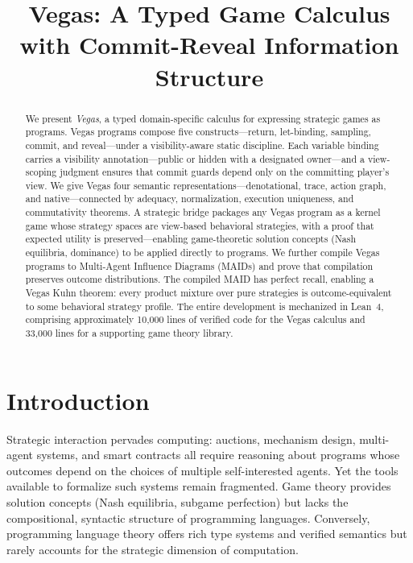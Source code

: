 \documentclass[11pt]{article}
\title{Vegas: A Typed Game Calculus\\with Commit-Reveal Information Structure}
\author{}
\date{}
\begin{document}
\maketitle
 
\begin{abstract}
We present \emph{Vegas}, a typed domain-specific calculus for expressing
strategic games as programs. Vegas programs compose five constructs---return,
let-binding, sampling, commit, and reveal---under a visibility-aware static
discipline. Each variable binding carries a visibility annotation---public or
hidden with a designated owner---and a view-scoping judgment ensures
that commit guards depend only on the committing player's view. We give Vegas four semantic representations---denotational,
trace, action graph, and native---connected by adequacy, normalization,
execution uniqueness, and commutativity theorems. A strategic bridge packages
any Vegas program as a kernel game whose strategy spaces are view-based
behavioral strategies, with a proof that expected utility is
preserved---enabling game-theoretic solution concepts (Nash equilibria,
dominance) to be applied directly to programs. We further compile Vegas programs to
Multi-Agent Influence Diagrams (MAIDs) and prove that compilation preserves
outcome distributions. The compiled MAID has perfect recall, enabling a
Vegas Kuhn theorem: every product mixture over pure strategies is
outcome-equivalent to some behavioral strategy profile. The entire
development is mechanized in Lean~4, comprising approximately 10,000 lines
of verified code for the Vegas calculus and 33,000 lines for a supporting
game theory library.
\end{abstract}

\section{Introduction}\label{sec:intro}

Strategic interaction pervades computing: auctions, mechanism design,
multi-agent systems, and smart contracts all require reasoning about programs
whose outcomes depend on the choices of multiple self-interested agents. Yet
the tools available to formalize such systems remain fragmented. Game theory
provides solution concepts (Nash equilibria, subgame perfection) but lacks the
compositional, syntactic structure of programming languages. Conversely,
programming language theory offers rich type systems and verified semantics but
rarely accounts for the strategic dimension of computation.
\end{document}
